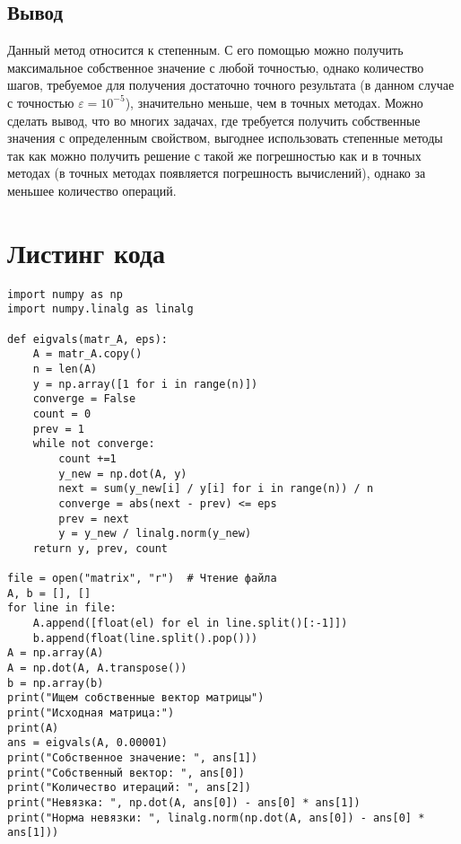 \documentclass[11.4pt]{article}
\begin{document}
	\subsection{Вывод}
	Данный метод относится к степенным. С его помощью можно получить максимальное собственное значение с любой точностью, однако количество шагов, требуемое для получения достаточно точного результата (в данном случае с точностью $\varepsilon=10^{-5}$), значительно меньше, чем в точных методах. Можно сделать вывод, что во многих задачах, где требуется получить собственные значения с определенным свойством, выгоднее использовать степенные методы  так как можно получить решение с такой же погрешностью как и в точных методах (в точных методах появляется погрешность вычислений), однако за меньшее количество операций. \par
\newpage
\section{Листинг кода}
\begin{verbatim}
import numpy as np
import numpy.linalg as linalg

def eigvals(matr_A, eps):
    A = matr_A.copy()
    n = len(A)
    y = np.array([1 for i in range(n)])
    converge = False
    count = 0
    prev = 1
    while not converge:
        count +=1
        y_new = np.dot(A, y)
        next = sum(y_new[i] / y[i] for i in range(n)) / n
        converge = abs(next - prev) <= eps
        prev = next
        y = y_new / linalg.norm(y_new)
    return y, prev, count

file = open("matrix", "r")  # Чтение файла
A, b = [], []
for line in file:
    A.append([float(el) for el in line.split()[:-1]])
    b.append(float(line.split().pop()))
A = np.array(A)
A = np.dot(A, A.transpose())
b = np.array(b)
print("Ищем собственные вектор матрицы")
print("Исходная матрица:")
print(A)
ans = eigvals(A, 0.00001)
print("Собственное значение: ", ans[1])
print("Собственный вектор: ", ans[0])
print("Количество итераций: ", ans[2])
print("Невязка: ", np.dot(A, ans[0]) - ans[0] * ans[1])
print("Норма невязки: ", linalg.norm(np.dot(A, ans[0]) - ans[0] * ans[1]))
\end{verbatim}
\end{document}
